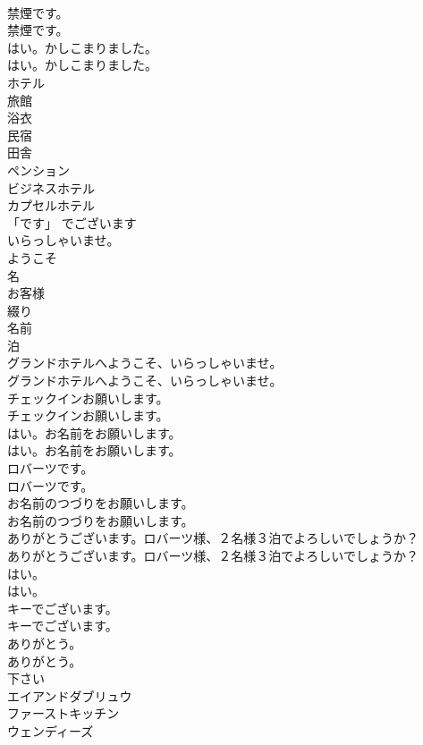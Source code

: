 \documentclass[8pt]{extreport}
\begin{document}
\begin{CJK}{UTF8}{min}
\\	禁煙です。	
\\	禁煙です。 
\\	はい。かしこまりました。	
\\	はい。かしこまりました。 
\\	ホテル
\\	旅館
\\	浴衣
\\	民宿
\\	田舎
\\	ペンション
\\	ビジネスホテル
\\	カプセルホテル
\\	「です」	でございます
\\	いらっしゃいませ。
\\	ようこそ
\\	名
\\	お客様
\\	綴り
\\	名前
\\	泊
\\	グランドホテルへようこそ、いらっしゃいませ。	
\\	グランドホテルへようこそ、いらっしゃいませ。 
\\	チェックインお願いします。	
\\	チェックインお願いします。 
\\	はい。お名前をお願いします。	
\\	はい。お名前をお願いします。 
\\	ロバーツです。	
\\	ロバーツです。 
\\	お名前のつづりをお願いします。	
\\	お名前のつづりをお願いします。 
\\	ありがとうございます。ロバーツ様、２名様３泊でよろしいでしょうか？	
\\	ありがとうございます。ロバーツ様、２名様３泊でよろしいでしょうか？ 
\\	はい。	
\\	はい。 
\\	キーでございます。	
\\	キーでございます。 
\\	ありがとう。	
\\	ありがとう。 
\\	下さい
\\	エイアンドダブリュウ
\\	ファーストキッチン
\\	ウェンディーズ

\end{CJK}
\end{document}

